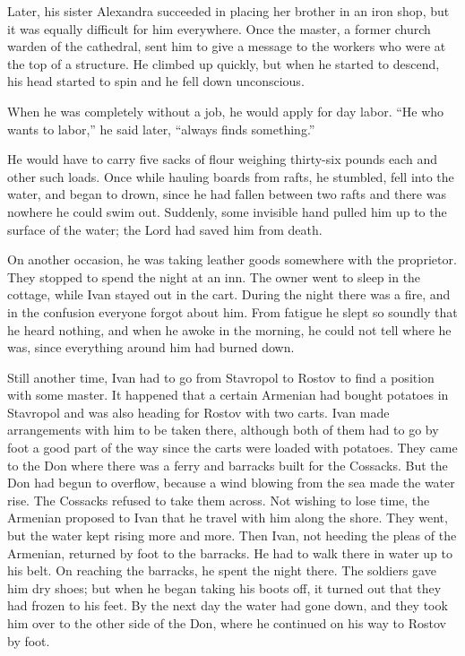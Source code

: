Later, his sister Alexandra succeeded in placing her brother in an iron shop, but it was equally difficult for him everywhere. Once the master, a former church warden of the cathedral, sent him to give a message to the workers who were at the top of a structure. He climbed up quickly, but when he started to descend, his head started to spin and he fell down unconscious.

When he was completely without a job, he would apply for day labor. “He who wants to labor,” he said later, “always finds something.”

He would have to carry five sacks of flour weighing thirty-six pounds each and other such loads. Once while hauling boards from rafts, he stumbled, fell into the water, and began to drown, since he had fallen between two rafts and there was nowhere he could swim out. Suddenly, some invisible hand pulled him up to the surface of the water; the Lord had saved him from death.

On another occasion, he was taking leather goods somewhere with the proprietor. They stopped to spend the night at an inn. The owner went to sleep in the cottage, while Ivan stayed out in the cart. During the night there was a fire, and in the confusion everyone forgot about him. From fatigue he slept so soundly that he heard nothing, and when he awoke in the morning, he could not tell where he was, since everything around him had burned down.

Still another time, Ivan had to go from Stavropol to Rostov to find a position with some master. It happened that a certain Armenian had bought potatoes in Stavropol and was also heading for Rostov with two carts. Ivan made arrangements with him to be taken there, although both of them had to go by foot a good part of the way since the carts were loaded with potatoes. They came to the Don where there was a ferry and barracks built for the Cossacks. But the Don had begun to overflow, because a wind blowing from the sea made the water rise. The Cossacks refused to take them across. Not wishing to lose time, the Armenian proposed to Ivan that he travel with him along the shore. They went, but the water kept rising more and more. Then Ivan, not heeding the pleas of the Armenian, returned by foot to the barracks. He had to walk there in water up to his belt. On reaching the barracks, he spent the night there. The soldiers gave him dry shoes; but when he began taking his boots off, it turned out that they had frozen to his feet. By the next day the water had gone down, and they took him over to the other side of the Don, where he continued on his way to Rostov by foot.

